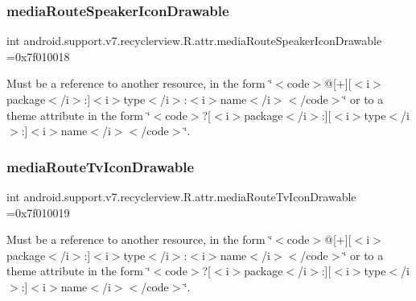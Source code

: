 \subsubsection{\texorpdfstring{media\+Route\+Speaker\+Icon\+Drawable}{mediaRouteSpeakerIconDrawable}}
{\footnotesize\ttfamily int android.\+support.\+v7.\+recyclerview.\+R.\+attr.\+media\+Route\+Speaker\+Icon\+Drawable =0x7f010018\hspace{0.3cm}{\ttfamily [static]}}

Must be a reference to another resource, in the form \char`\"{}$<$code$>$@\mbox{[}+\mbox{]}\mbox{[}$<$i$>$package$<$/i$>$\+:\mbox{]}$<$i$>$type$<$/i$>$\+:$<$i$>$name$<$/i$>$$<$/code$>$\char`\"{} or to a theme attribute in the form \char`\"{}$<$code$>$?\mbox{[}$<$i$>$package$<$/i$>$\+:\mbox{]}\mbox{[}$<$i$>$type$<$/i$>$\+:\mbox{]}$<$i$>$name$<$/i$>$$<$/code$>$\char`\"{}. \mbox{\label{classandroid_1_1support_1_1v7_1_1recyclerview_1_1R_1_1attr_a5572dca1e481e5976cd727ded44ce90d}} 
\subsubsection{\texorpdfstring{media\+Route\+Tv\+Icon\+Drawable}{mediaRouteTvIconDrawable}}
{\footnotesize\ttfamily int android.\+support.\+v7.\+recyclerview.\+R.\+attr.\+media\+Route\+Tv\+Icon\+Drawable =0x7f010019\hspace{0.3cm}{\ttfamily [static]}}

Must be a reference to another resource, in the form \char`\"{}$<$code$>$@\mbox{[}+\mbox{]}\mbox{[}$<$i$>$package$<$/i$>$\+:\mbox{]}$<$i$>$type$<$/i$>$\+:$<$i$>$name$<$/i$>$$<$/code$>$\char`\"{} or to a theme attribute in the form \char`\"{}$<$code$>$?\mbox{[}$<$i$>$package$<$/i$>$\+:\mbox{]}\mbox{[}$<$i$>$type$<$/i$>$\+:\mbox{]}$<$i$>$name$<$/i$>$$<$/code$>$\char`\"{}. \mbox{\label{classandroid_1_1support_1_1v7_1_1recyclerview_1_1R_1_1attr_a59ac456be2890b4872752efb7d1abb4d}} 
